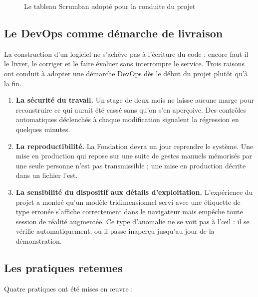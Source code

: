 \begin{figure}[htbp]
\centering
{}
\caption{Le tableau Scrumban adopté pour la conduite du projet}
\label{fig:scrumban}
\end{figure}

\subsection{Le DevOps comme démarche de livraison}

La construction d'un logiciel ne s'achève pas à l'écriture du code : encore
faut-il le livrer, le corriger et le faire évoluer sans interrompre le service.
Trois raisons ont conduit à adopter une démarche DevOps dès le début du projet
plutôt qu'à la fin.

\begin{enumerate}
  \item \textbf{La sécurité du travail.} Un stage de deux mois ne laisse aucune
        marge pour reconstruire ce qui aurait été cassé sans qu'on s'en
        aperçoive. Des contrôles automatiques déclenchés à chaque modification
        signalent la régression en quelques minutes.

  \item \textbf{La reproductibilité.} La Fondation devra un jour reprendre le
        système. Une mise en production qui repose sur une suite de gestes
        manuels mémorisés par une seule personne n'est pas transmissible ; une
        mise en production décrite dans un fichier l'est.

  \item \textbf{La sensibilité du dispositif aux détails d'exploitation.}
        L'expérience du projet a montré qu'un modèle tridimensionnel servi avec
        une étiquette de type erronée s'affiche correctement dans le navigateur
        mais empêche toute session de réalité augmentée. Ce type d'anomalie ne
        se voit pas à l'œil : il se vérifie automatiquement, ou il passe
        inaperçu jusqu'au jour de la démonstration.
\end{enumerate}

\subsection{Les pratiques retenues}

Quatre pratiques ont été mises en œuvre :

